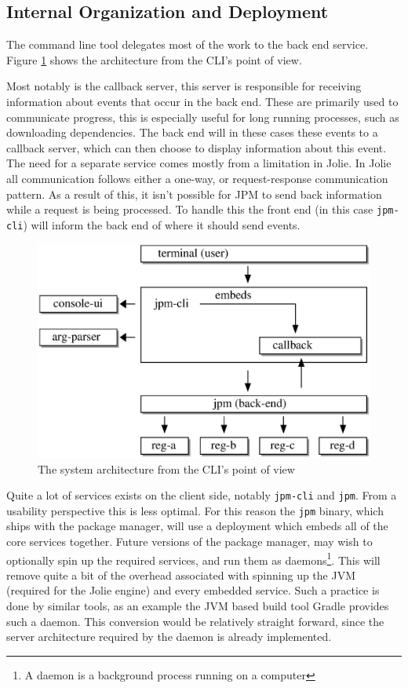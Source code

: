 \subsection{Internal Organization and Deployment}

The command line tool delegates most of the work to the back end service.
Figure \ref{fig:cli_arch} shows the architecture from the CLI's point of view.

Most notably is the callback server, this server is responsible for receiving
information about events that occur in the back end. These are primarily used
to communicate progress, this is especially useful for long running processes,
   such as downloading dependencies. The back end will in these cases these
   events to a callback server, which can then choose to display information
   about this event. The need for a separate service comes mostly from a
   limitation in Jolie. In Jolie all communication follows either a one-way, or
   request-response communication pattern. As a result of this, it isn't
   possible for JPM to send back information while a request is being
   processed. To handle this the front end (in this case
           \texttt{jpm-cli}) will inform the back end of where it
   should send events.

\begin{figure}[H]
\centering
\includegraphics[width=1.0\textwidth]{package_manager/cli_arch.eps}
\caption{The system architecture from the CLI's point of view}
\label{fig:cli_arch}
\end{figure}

Quite a lot of services exists on the client side, notably
\texttt{jpm-cli} and \texttt{jpm}. From a usability
perspective this is less optimal. For this reason the \texttt{jpm}
binary, which ships with the package manager, will use a deployment which
embeds all of the core services together. Future versions of the package
manager, may wish to optionally spin up the required services, and run them as
daemons\footnote{A daemon is a background process running on a computer}. This
will remove quite a bit of the overhead associated with spinning up the JVM
(required for the Jolie engine) and every embedded service. Such a practice is
done by similar tools, as an example the JVM based build tool Gradle provides
such a daemon\autocite{GRAA}.  This conversion would be relatively straight
forward, since the server architecture required by the daemon is already
implemented.
